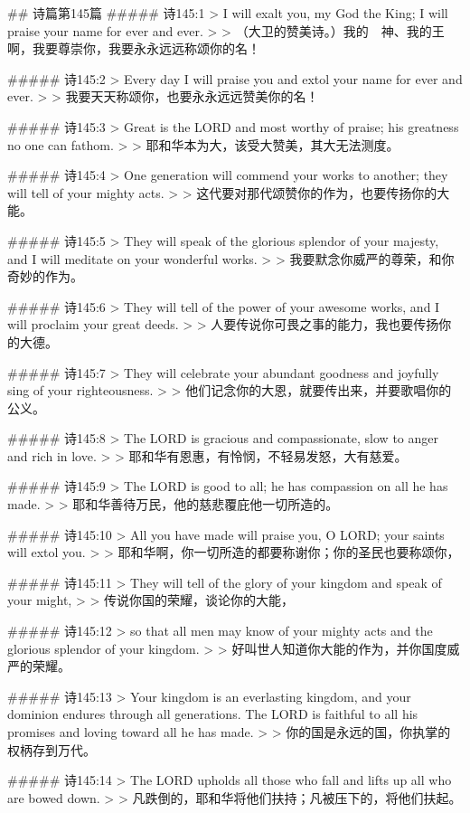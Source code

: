 ## 诗篇第145篇
##### 诗145:1
> I will exalt you, my God the King; I will praise your name for ever and ever.
>
> （大卫的赞美诗。）我的　神、我的王啊，我要尊崇你，我要永永远远称颂你的名！


##### 诗145:2
> Every day I will praise you and extol your name for ever and ever.
>
> 我要天天称颂你，也要永永远远赞美你的名！


##### 诗145:3
> Great is the LORD and most worthy of praise; his greatness no one can fathom.
>
> 耶和华本为大，该受大赞美，其大无法测度。


##### 诗145:4
> One generation will commend your works to another; they will tell of your mighty acts.
>
> 这代要对那代颂赞你的作为，也要传扬你的大能。


##### 诗145:5
> They will speak of the glorious splendor of your majesty, and I will meditate on your wonderful works.
>
> 我要默念你威严的尊荣，和你奇妙的作为。


##### 诗145:6
> They will tell of the power of your awesome works, and I will proclaim your great deeds.
>
> 人要传说你可畏之事的能力，我也要传扬你的大德。


##### 诗145:7
> They will celebrate your abundant goodness and joyfully sing of your righteousness.
>
> 他们记念你的大恩，就要传出来，并要歌唱你的公义。


##### 诗145:8
> The LORD is gracious and compassionate, slow to anger and rich in love.
>
> 耶和华有恩惠，有怜悯，不轻易发怒，大有慈爱。


##### 诗145:9
> The LORD is good to all; he has compassion on all he has made.
>
> 耶和华善待万民，他的慈悲覆庇他一切所造的。


##### 诗145:10
> All you have made will praise you, O LORD; your saints will extol you.
>
> 耶和华啊，你一切所造的都要称谢你；你的圣民也要称颂你，


##### 诗145:11
> They will tell of the glory of your kingdom and speak of your might,
>
> 传说你国的荣耀，谈论你的大能，


##### 诗145:12
> so that all men may know of your mighty acts and the glorious splendor of your kingdom.
>
> 好叫世人知道你大能的作为，并你国度威严的荣耀。


##### 诗145:13
> Your kingdom is an everlasting kingdom, and your dominion endures through all generations. The LORD is faithful to all his promises and loving toward all he has made.
>
> 你的国是永远的国，你执掌的权柄存到万代。


##### 诗145:14
> The LORD upholds all those who fall and lifts up all who are bowed down.
>
> 凡跌倒的，耶和华将他们扶持；凡被压下的，将他们扶起。



